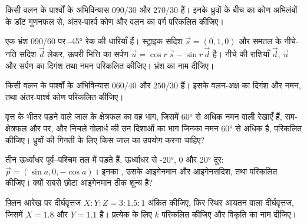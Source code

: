 \begin{exercise}[$\star$]\label{exo:b3:structural-analysis:3}
किसी वलन के पार्श्वों के अभिविन्यास $090/30$ और $270/30$ हैं। इनके ध्रुवों के बीच का
कोण अभिलंबों के डॉट गुणनफल से, अंतर-पार्श्व कोण
और वलन का वर्ग परिकलित कीजिए।
\end{exercise}

\begin{exercise}[$\star$]\label{exo:b3:structural-analysis:4}
एक भ्रंश $090/60$ पर \ang{-45} रेक की धारियाँ हैं। स्ट्राइक सदिश
$\vec s = (0, 1, 0)$ और समतल के नीचे-नति सदिश $\vec d$ लेकर, ऊपरी भित्ति का सर्पण
$\vec u = \cos r\,\vec s - \sin r\,\vec d$ है। नीचे की राशियाँ
$\vec d$, $\vec u$ और सर्पण का दिगंश तथा नमन परिकलित कीजिए। भ्रंश का नाम दीजिए।
\end{exercise}

\begin{exercise}[$\star\star$]\label{exo:b3:structural-analysis:5}
किसी वलन के पार्श्वों के अभिविन्यास $060/40$ और $250/30$ हैं। इसके वलन-अक्ष का
दिगंश और नमन, तथा अंतर-पार्श्व कोण परिकलित कीजिए।
\end{exercise}

\begin{exercise}[$\star\star$]\label{exo:b3:structural-analysis:6}
वृत्त के भीतर पड़ने वाले जाल के क्षेत्रफल का वह भाग,
जिसमें \ang{60} से अधिक नमन वाली रेखाएँ हैं, सम-क्षेत्रफल और  पर,
और निचले गोलार्ध की उन दिशाओं का भाग जिनका नमन
\ang{60} से अधिक है, परिकलित कीजिए। ध्रुवों की गिनती के लिए किस जाल का उपयोग करना चाहिए?
\end{exercise}

\begin{exercise}[$\star\star$]\label{exo:b3:structural-analysis:7}
तीन  ऊर्ध्वाधर पूर्व--पश्चिम तल में पड़ते हैं, ऊर्ध्वाधर से \ang{-20}, $0$ और
\ang{20} दूर: $\vec p = (\sin a, 0, -\cos a)$। इनका
, उसके आइगेनमान और आइगेनसदिश, तथा  परिकलित कीजिए। क्यों
सबसे छोटा आइगेनमान ठीक शून्य है?
\end{exercise}

\begin{exercise}[$\star\star$]\label{exo:b3:structural-analysis:8}
फ़्लिन आरेख पर दीर्घवृत्तज $X : Y : Z = 3 : 1.5 : 1$ अंकित कीजिए, फिर
स्थिर आयतन वाला दीर्घवृत्तज, जिसमें $X = 1.8$ और $Y = 1.1$ है। प्रत्येक के लिए $k$ परिकलित कीजिए
और विकृति का नाम दीजिए।
\end{exercise}

